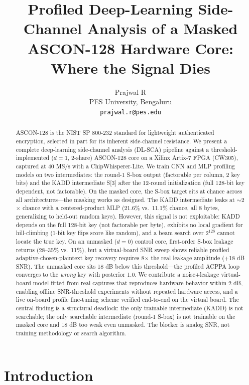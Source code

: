 \documentclass[a4paper,11pt,twocolumn]{article}
\title{Profiled Deep-Learning Side-Channel Analysis of a Masked ASCON-128 Hardware Core: Where the Signal Dies}
\author{
  Prajwal R\\
  \small PES University, Bengaluru\\
  \small \texttt{prajwal.r@pes.edu}
}
\date{}
\begin{document}
\maketitle

\begin{abstract}
ASCON-128 is the NIST SP 800-232 standard for lightweight authenticated encryption, selected in part for its inherent side-channel resistance. We present a complete deep-learning side-channel analysis (DL-SCA) pipeline against a threshold-implemented ($d=1$, 2-share) ASCON-128 core on a Xilinx Artix-7 FPGA (CW305), captured at 40 MS/s with a ChipWhisperer-Lite. We train CNN and MLP profiling models on two intermediates: the round-1 S-box output (factorable per column, 2 key bits) and the KADD intermediate S[3] after the 12-round initialization (full 128-bit key dependent, not factorable). On the masked core, the S-box target sits at chance across all architectures---the masking works as designed. The KADD intermediate leaks at $\sim$2$\times$ chance with a centered-product MLP (21.6\% vs.\ 11.1\% chance, all 8 bytes, generalizing to held-out random keys). However, this signal is not exploitable: KADD depends on the full 128-bit key (not factorable per byte), exhibits no local gradient for hill-climbing (1-bit key flips score like random), and a beam search over $2^{128}$ cannot locate the true key. On an unmasked ($d=0$) control core, first-order S-box leakage returns (28--35\% vs.\ 11\%), but a virtual-board SNR sweep shows reliable profiled adaptive-chosen-plaintext key recovery requires 8$\times$ the real leakage amplitude (+18 dB SNR). The unmasked core sits 18 dB below this threshold---the profiled ACPPA loop converges to the \emph{wrong} key with posterior 1.0. We contribute a noise+leakage virtual-board model fitted from real captures that reproduces hardware behavior within 2 dB, enabling offline SNR-threshold experiments without repeated hardware access, and a live on-board profile fine-tuning scheme verified end-to-end on the virtual board. The central finding is a structural deadlock: the only trainable intermediate (KADD) is not searchable; the only searchable intermediate (round-1 S-box) is not trainable on the masked core and 18 dB too weak even unmasked. The blocker is analog SNR, not training methodology or search algorithm.
\end{abstract}

\section{Introduction}
\end{document}
